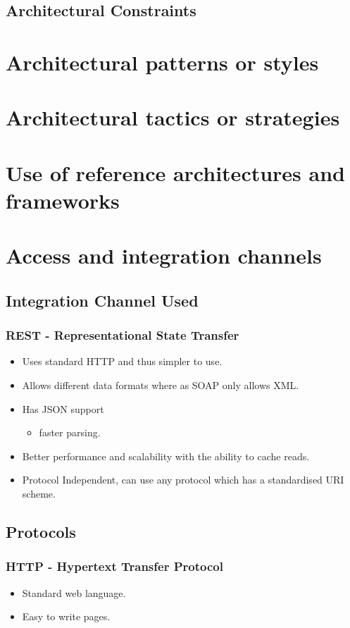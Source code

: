 \documentclass[12pt, oneside]{article}
\begin{document}
	\subsection{Architectural Constraints}		

\section{Architectural patterns or styles}
\section{Architectural tactics or strategies}
\section{Use of reference architectures and frameworks}
\newpage
\section{Access and integration channels}
	\subsection{Integration Channel Used}
		\subsubsection{REST - Representational State Transfer}
		\begin{itemize}
			\item Uses standard HTTP and thus simpler to use.
		 	\item Allows different data formats where as SOAP only allows XML.
			\item Has JSON support
				\begin{itemize}
					\item faster parsing.				
				\end{itemize}			 
			\item Better performance and scalability with the ability to cache reads.
			\item Protocol Independent, can use any protocol which has a standardised URI scheme.		
		\end{itemize}
	\subsection{Protocols}
		\subsubsection{HTTP - Hypertext Transfer Protocol}
			\begin{itemize}
				\item Standard web language.
				\item Easy to write pages.
			\end{itemize}
\end{document}
